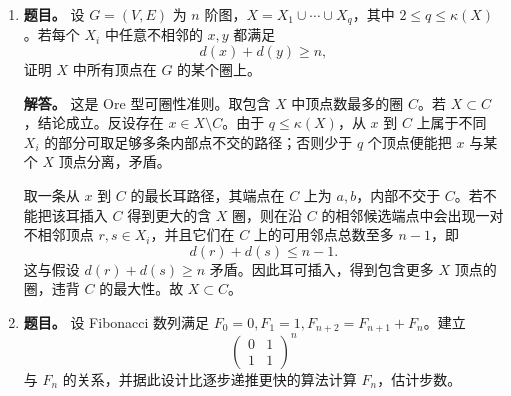 ﻿\documentclass[UTF8,12pt]{ctexart}
\begin{document}
\begin{enumerate}[label=\textbf{\arabic*.},leftmargin=2.2em]
令
\[
\lambda=\frac{\Delta t}{\Delta x}.
\]
格式可写为
\[
u_j^{n+1}=(1-\lambda)u_j^n+\lambda u_{j-1}^n,
\qquad
v_j^{n+1}=(1-\lambda)v_j^n+\lambda v_{j+1}^n.
\]
若
\[
0\le\lambda\le1,
\]
则两式均为凸组合。由凸性，
\[
|u_j^{n+1}|^2\le(1-\lambda)|u_j^n|^2+\lambda|u_{j-1}^n|^2,
\]
\[
|v_j^{n+1}|^2\le(1-\lambda)|v_j^n|^2+\lambda|v_{j+1}^n|^2.
\]
对所有格点求和，并使用离散边界条件 \(u_{-N}^{n+1}=v_{-N}^{n+1}\)、\(v_N^{n+1}=u_N^{n+1}\)，边界流入项恰与另一变量边界值配对，得到
\[
E^{n+1}\le E^n.
\]
故可取
\[
\lambda_0=1.
\]
同样，由凸组合性质，
\[
|u_j^{n+1}|\le\max_i|u_i^n|,\qquad
|v_j^{n+1}|\le\max_i|v_i^n|.
\]
结合边界更新，得到
\[
\max_j\max(|u_j^{n+1}|,|v_j^{n+1}|)
\le
\max_j\max(|u_j^n|,|v_j^n|).
\]

\item \textbf{题目。} 设 \(G=(V,E)\) 为 \(n\) 阶图，\(X=X_1\cup\cdots\cup X_q\)，其中 \(2\le q\le\kappa(X)\)。若每个 \(X_i\) 中任意不相邻的 \(x,y\) 都满足
\[
d(x)+d(y)\ge n,
\]
证明 \(X\) 中所有顶点在 \(G\) 的某个圈上。

\textbf{解答。} 这是 Ore 型可圈性准则。取包含 \(X\) 中顶点数最多的圈 \(C\)。若 \(X\subset C\)，结论成立。反设存在 \(x\in X\setminus C\)。由于 \(q\le\kappa(X)\)，从 \(x\) 到 \(C\) 上属于不同 \(X_i\) 的部分可取足够多条内部点不交的路径；否则少于 \(q\) 个顶点便能把 \(x\) 与某个 \(X\) 顶点分离，矛盾。

取一条从 \(x\) 到 \(C\) 的最长耳路径，其端点在 \(C\) 上为 \(a,b\)，内部不交于 \(C\)。若不能把该耳插入 \(C\) 得到更大的含 \(X\) 圈，则在沿 \(C\) 的相邻候选端点中会出现一对不相邻顶点 \(r,s\in X_i\)，并且它们在 \(C\) 上的可用邻点总数至多 \(n-1\)，即
\[
d(r)+d(s)\le n-1.
\]
这与假设 \(d(r)+d(s)\ge n\) 矛盾。因此耳可插入，得到包含更多 \(X\) 顶点的圈，违背 \(C\) 的最大性。故 \(X\subset C\)。

\item \textbf{题目。} 设 Fibonacci 数列满足 \(F_0=0,F_1=1,F_{n+2}=F_{n+1}+F_n\)。建立
\[
\begin{pmatrix}0&1\\1&1\end{pmatrix}^n
\]
与 \(F_n\) 的关系，并据此设计比逐步递推更快的算法计算 \(F_n\)，估计步数。


\end{enumerate}
\end{document}
